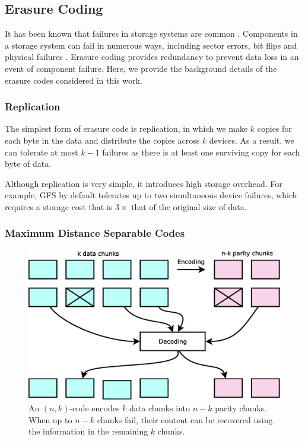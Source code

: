 
\subsection{Erasure Coding}
\label{sec:ec_background}

It has been known that failures in storage systems are common \cite{ghemawat03}.
Components in a storage system can fail in numerous ways, including sector
errors, bit flips and physical failures \cite{plank13}. Erasure coding provides
redundancy to prevent data loss in an event of component failure. Here, we
provide the background details of the erasure codes considered in
this work. 

\subsubsection{Replication}

The simplest form of erasure code is replication, in which we make $k$ copies
for each byte in the data and distribute the copies across $k$ devices. As a
result, we can tolerate at most $k-1$ failures as there is at least one
surviving copy for each byte of data.

Although replication is very simple, it introduces high storage overhead. For
example, GFS \cite{ghemawat03} by default tolerates up to two simultaneous
device failures, which requires a storage cost that is $3\times$ that of the original
size of data.

\subsubsection{Maximum Distance Separable Codes}


\begin{figure}[t]
    \centering
    \includegraphics[width=0.7\linewidth]{figs/erasure_code}
    \caption{An $(n,k)$-code encodes $k$ data chunks into $n-k$ parity chunks.
        When up to $n-k$ chunks fail, their content can be recovered using the
        information in the remaining $k$ chunks.}
    \label{fig:erasure_code}
\end{figure}

